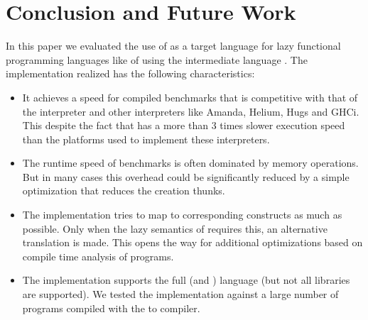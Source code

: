 \section{Conclusion and Future Work}\label{sapljs:sec:conclusions}
In this paper we evaluated the use of \JS as a target language for lazy functional programming languages like \Haskell of \Clean using the intermediate language \Sapl.
The implementation realized has the following characteristics:

\begin{itemize}
\item It achieves a speed for compiled benchmarks 
that is competitive with that of the  \Sapl interpreter and other interpreters like \textsf{Amanda}, 
\textsf{Helium}, \textsf{Hugs} and \textsf{GHCi}.
This despite the fact that \JS has a more than 3 times slower execution speed 
than the platforms used to implement these interpreters.
\item The runtime speed of benchmarks is often dominated by memory operations. 
But in many cases this overhead could be significantly reduced by a simple optimization
that reduces the creation thunks.
\item  The implementation tries to map \Sapl to corresponding \JS constructs as much as possible.
Only when the lazy semantics of \Sapl requires this, an alternative translation is made.
This opens the way for additional optimizations based on compile time analysis of programs.
\item The implementation supports the full \Clean (and \Haskell) language (but not all libraries are supported).
We tested the implementation against a large number of \Clean programs compiled with  the \Clean to \Sapl compiler. 

\end{itemize}

